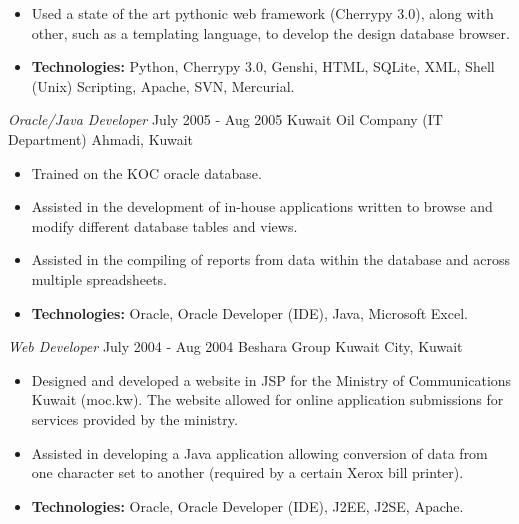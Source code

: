 \documentclass[line,margin]{res}
\begin{document}
\begin{resume}
\addvspace{\sectionskip}

        \begin{itemize}  \itemsep -2pt %
    \item Used a state of the art pythonic web framework (Cherrypy 3.0), 
    along with other, such as a templating language, to develop the design 
    database browser. 
    \item {\bf Technologies:} \hspace{1pt} 
        Python, Cherrypy 3.0, Genshi, HTML, SQLite, XML, \newline
        \hspace*{72pt} Shell (Unix) Scripting, Apache, SVN, Mercurial.
        \end{itemize}

    {\sl Oracle/Java Developer} \hfill July 2005 - Aug 2005
    Kuwait Oil Company  (IT Department) \hfill  Ahmadi, Kuwait
    \smallskip
        \begin{itemize}  \itemsep -2pt %
    \item Trained on the KOC oracle database.
    \item Assisted in the development of in-house applications written to
        browse and \\ modify different database tables and views.
    \item Assisted in the compiling of reports from data within the database
        and across multiple spreadsheets.
    \item {\bf Technologies:} \hspace{3pt}
        Oracle, Oracle Developer (IDE), Java, Microsoft Excel.
        \end{itemize}

    {\sl Web Developer} \hfill July 2004 - Aug 2004
    Beshara Group \hfill Kuwait City, Kuwait
    \smallskip
        \begin{itemize}  \itemsep -2pt %
    \item Designed and developed a website in JSP for the Ministry of
        Communications Kuwait (moc.kw). The website allowed for online
        application submissions for services provided by the ministry.
    \item Assisted in developing a Java application allowing conversion of data
        from one character set to another (required by a certain Xerox bill
        printer).
    \item {\bf Technologies:} \hspace{3pt}
        Oracle, Oracle Developer (IDE), J2EE, J2SE, Apache.
        \end{itemize}
    

\end{resume}
\end{document}
